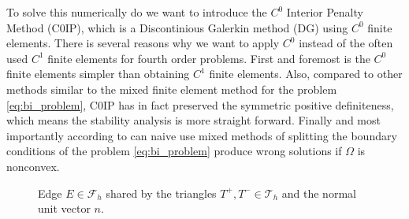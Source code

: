 To solve this numerically do we want to introduce the $C^{0}$ Interior Penalty Method (C0IP), which is a Discontinious Galerkin
method (DG) using $C^{0}$ finite elements. There is several reasons why we want to apply $C^{0}$ instead of the often used
$C^{1}$ finite elements for fourth order problems. First and foremost is the $C^0$ finite elements simpler than
obtaining $C^{1}$ finite elements.  Also, compared to other methods similar to the mixed
finite element method for the problem \eqref{eq:bi_problem}, C0IP has in fact
preserved the symmetric positive definiteness, which means the stability analysis is more straight forward. Finally and most
importantly according to \cite{brenner2012quadratic} can naive use mixed methods of splitting the boundary conditions of
the problem \eqref{eq:bi_problem} produce wrong solutions if $\Omega $ is nonconvex.

\begin{figure}[!h]
\centering
{}
\caption{Edge $E \in \mathcal{F}_h $ shared by the triangles $T^{+}, T^{-} \in \mathcal{T}_{h} $ and the normal unit vector $n$.  }
    \label{fig:normal}
\end{figure}

